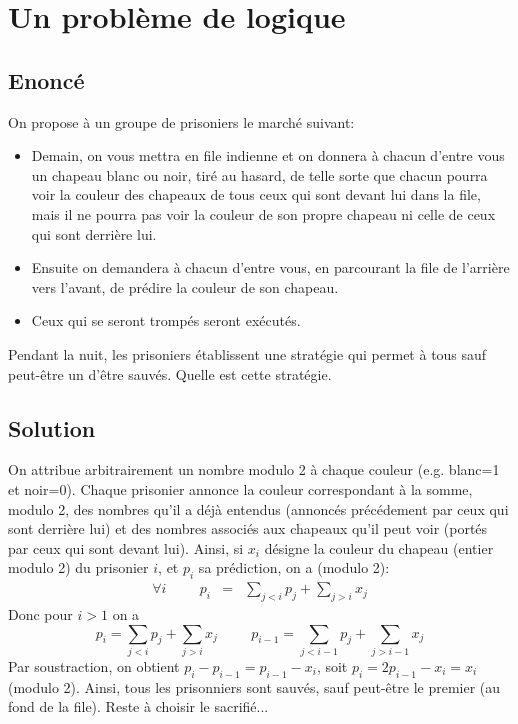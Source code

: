 \documentclass{article}
\newenvironment{statement}{\subsection{Enoncé}}{\pagebreak}
\newenvironment{solution}{\subsection{Solution}}{\pagebreak}
\begin{document}
\section{Un problème de logique}
\begin{statement}
On propose à un groupe de prisoniers le marché suivant:
\begin{itemize}
\item
Demain, on vous mettra en file indienne et on donnera à chacun d'entre vous un chapeau blanc ou noir, tiré au hasard, de telle sorte que chacun pourra voir la couleur des chapeaux de tous ceux qui sont devant lui dans la file, mais il ne pourra pas voir la couleur de son propre chapeau ni celle de ceux qui sont derrière lui.
\item
Ensuite on demandera à chacun d'entre vous, en parcourant la file de l'arrière vers l'avant, de prédire la couleur de son chapeau.
\item
Ceux qui se seront trompés seront exécutés.
\end{itemize}
Pendant la nuit, les prisoniers établissent une stratégie qui permet à tous sauf peut-être un d'être sauvés. Quelle est cette stratégie.
\end{statement}
\begin{solution}
On attribue arbitrairement un nombre modulo 2 à chaque couleur (e.g. blanc=1 et noir=0). Chaque prisonier annonce la couleur correspondant à la somme, modulo 2, des nombres qu'il a déjà entendus (annoncés précédement par ceux qui sont derrière lui) et des nombres associés aux chapeaux qu'il peut voir (portés par ceux qui sont devant lui). Ainsi, si $x_i$ désigne la couleur du chapeau (entier modulo 2) du prisonier $i$, et $p_i$ sa prédiction, on a (modulo 2):
\begin{eqnarray*}
\forall i\hspace{1cm}p_i & = & \sum_{j<i}p_j+\sum_{j>i}x_j
\end{eqnarray*}
Donc pour $i>1$ on a
\[
p_i = \sum_{j<i}p_j+\sum_{j>i}x_j
\hspace{1cm}
p_{i-1} = \sum_{j<i-1}p_j+\sum_{j>i-1}x_j
\]
Par soustraction, on obtient $p_i-p_{i-1}=p_{i-1}-x_i$, soit $p_i=2p_{i-1}-x_i=x_i$ (modulo 2). Ainsi, tous les prisonniers sont sauvés, sauf peut-être le premier (au fond de la file). Reste à choisir le sacrifié...
\end{solution}
\end{document}
